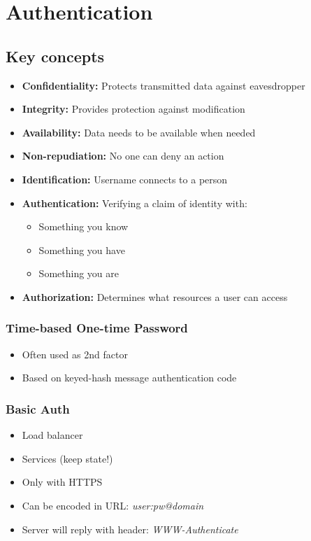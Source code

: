 

\section{Authentication}

\subsection{Key concepts}
\begin{itemize}
    \item \textbf{Confidentiality:} Protects transmitted data against eavesdropper
    \item \textbf{Integrity:} Provides protection against modification
    \item \textbf{Availability:} Data needs to be available when needed
    \item \textbf{Non-repudiation:} No one can deny an action
    \item \textbf{Identification:} Username connects to a person
    \item \textbf{Authentication:} Verifying a claim of identity with:
    \begin{itemize}
        \item Something you know
        \item Something you have
        \item Something you are
    \end{itemize}
    \item \textbf{Authorization:} Determines what resources a user can access
\end{itemize}

\subsubsection{Time-based One-time Password}
\begin{itemize}
    \item Often used as 2nd factor
    \item Based on keyed-hash message authentication code
\end{itemize}

\subsubsection{Basic Auth}
\begin{itemize}
    \item Load balancer
    \item Services (keep state!)
    \item Only with HTTPS
    \item Can be encoded in URL: \textit{user:pw@domain}
    \item Server will reply with header: \textit{WWW-Authenticate}
\end{itemize}

